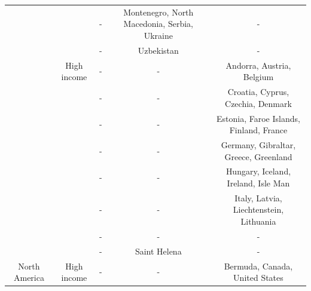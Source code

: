 \documentclass[
]{article}
\begin{document}
\begin{table}
{\begin{tabular}[t]{ccccc}
 &  & - & Montenegro, North Macedonia, Serbia, Ukraine & -\\
 &  & - & Uzbekistan & -\\
 & High income & - & - & Andorra, Austria, Belgium\\
 &  & - & - & Croatia, Cyprus, Czechia, Denmark\\
 &  & - & - & Estonia, Faroe Islands, Finland, France\\
 &  & - & - & Germany, Gibraltar, Greece, Greenland\\
 &  & - & - & Hungary, Iceland, Ireland, Isle  Man\\
 &  & - & - & Italy, Latvia, Liechtenstein, Lithuania\\
 &  & - & - & -\\
 &  & - & Saint Helena & -\\
\cline{1-5}
North America & High income & - & - & Bermuda, Canada, United States\\
\bottomrule
\end{tabular}}
\end{table}
\end{document}
